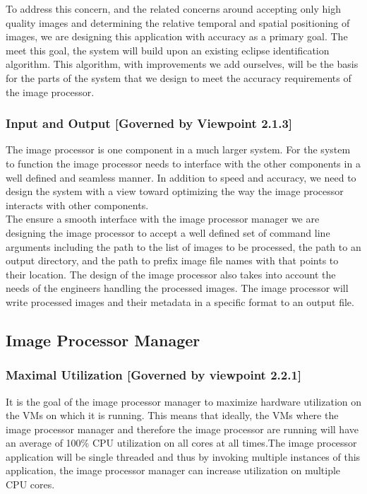 \documentclass[10pt, onecolumn, draftclsnofoot, letterpaper, compsoc]{IEEEtran}
\begin{document}
To address this concern, and the related concerns around accepting only high
quality images and determining the relative temporal and spatial positioning of
images, we are designing this application with accuracy as a primary goal. The
meet this goal, the system will build upon an existing eclipse identification
algorithm. This algorithm, with improvements we add ourselves, will be the basis
for the parts of the system that we design to meet the accuracy requirements of
the image processor.\\

\subsubsection{Input and Output [Governed by Viewpoint 2.1.3]}

The image processor is one component in a much larger system. For the system to
function the image processor needs to interface with the other components in a
well defined and seamless manner. In addition to speed and accuracy, we need to
design the system with a view toward optimizing the way the image processor
interacts with other components.\\

The ensure a smooth interface with the image processor manager we are designing
the image processor to accept a well defined set of command line arguments
including the path to the list of images to be processed, the path to an output
directory, and the path to prefix image file names with that points to their
location. The design of the image processor also takes into account the needs of
the engineers handling the processed images. The image processor will write
processed images and their metadata in a specific format to an output file.\\

\subsection{Image Processor Manager}

    \subsubsection{Maximal Utilization [Governed by viewpoint 2.2.1]}
    It is the goal of the image processor manager to maximize hardware utilization on the VMs on which it is 
    running. This means that ideally, the VMs where the image processor manager and therefore the image 
    processor are running will have an average of 100\% CPU utilization on all cores at all times.The image 
    processor application will be single threaded and thus by invoking multiple instances of this application, 
    the image processor manager can increase utilization on multiple CPU cores. \\
\end{document}
